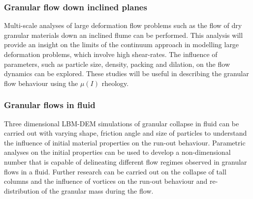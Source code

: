 \subsubsection*{Granular flow down inclined planes}

Multi-scale analyses of large deformation flow problems such as the flow of dry 
granular materials down an inclined flume can be performed. This analysis will 
provide an insight on the limits of the continuum approach in modelling large 
deformation problems, which involve high shear-rates. The influence of 
parameters, such as particle size, density, packing and dilation, on the flow 
dynamics can be explored. These studies will be useful in describing the 
granular flow behaviour using the $\mu(I)$ rheology.

\subsubsection*{Granular flows in fluid}

Three dimensional LBM-DEM simulations of granular collapse in fluid can be 
carried out with varying shape, friction angle and size of particles to 
understand the influence of initial material properties on the run-out 
behaviour. Parametric analyses on the initial properties can be used to develop 
a non-dimensional number that is capable of delineating different flow regimes 
observed in granular flows in a fluid. Further research can be carried out on 
the collapse of tall columns and the influence of vortices on the run-out 
behaviour and re-distribution of the granular mass during the flow.



